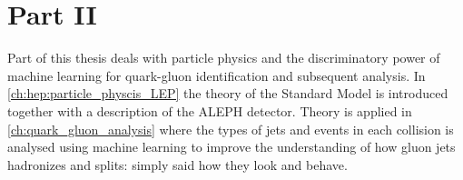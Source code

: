 \documentclass[a4paper, twoside, nobib, justified]{tufte-book} %
\newcommand{\RNum}[1]{\uppercase\expandafter{\romannumeral #1\relax}}
\begin{document}





\chapter*{Part II}
Part \RNum{2} of this thesis deals with particle physics and the discriminatory power of machine learning for quark-gluon identification and subsequent analysis. In \autoref{ch:hep:particle_physcis_LEP} the theory of the Standard Model is introduced together with a description of the ALEPH detector. Theory is applied in \autoref{ch:quark_gluon_analysis} where the types of jets and events in each collision is analysed using machine learning to improve the understanding of how gluon jets hadronizes and splits: simply said how they look and behave. 






% 

% 




\appendix

% 





\backmatter

\begin{fullwidth}
\listoffigures
{}
\end{fullwidth}

\begin{fullwidth}
\listoftables
{}
\end{fullwidth}


\cleardoublepage
{}
{}

% 


\printindex
\end{document}
